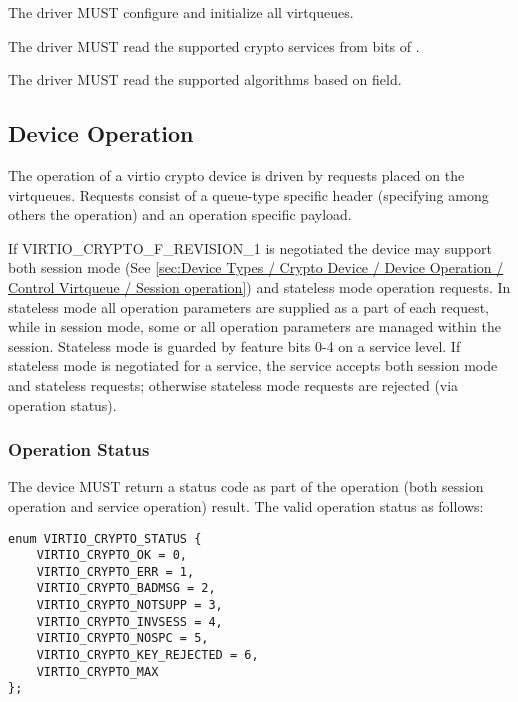 \begin{itemize*}
\item The driver MUST configure and initialize all virtqueues.
\item The driver MUST read the supported crypto services from bits of .
\item The driver MUST read the supported algorithms based on  field.
\end{itemize*}

\subsection{Device Operation}\label{sec:Device Types / Crypto Device / Device Operation}

The operation of a virtio crypto device is driven by requests placed on the virtqueues.
Requests consist of a queue-type specific header (specifying among others the operation)
and an operation specific payload.

If VIRTIO_CRYPTO_F_REVISION_1 is negotiated the device may support both session mode
(See \ref{sec:Device Types / Crypto Device / Device Operation / Control Virtqueue / Session operation})
and stateless mode operation requests.
In stateless mode all operation parameters are supplied as a part of each request,
while in session mode, some or all operation parameters are managed within the
session. Stateless mode is guarded by feature bits 0-4 on a service level. If
stateless mode is negotiated for a service, the service accepts both session
mode and stateless requests; otherwise stateless mode requests are rejected
(via operation status).

\subsubsection{Operation Status}\label{sec:Device Types / Crypto Device / Device Operation / Operation status}
The device MUST return a status code as part of the operation (both session
operation and service operation) result. The valid operation status as follows:

\begin{lstlisting}
enum VIRTIO_CRYPTO_STATUS {
    VIRTIO_CRYPTO_OK = 0,
    VIRTIO_CRYPTO_ERR = 1,
    VIRTIO_CRYPTO_BADMSG = 2,
    VIRTIO_CRYPTO_NOTSUPP = 3,
    VIRTIO_CRYPTO_INVSESS = 4,
    VIRTIO_CRYPTO_NOSPC = 5,
    VIRTIO_CRYPTO_KEY_REJECTED = 6,
    VIRTIO_CRYPTO_MAX
};
\end{lstlisting}

